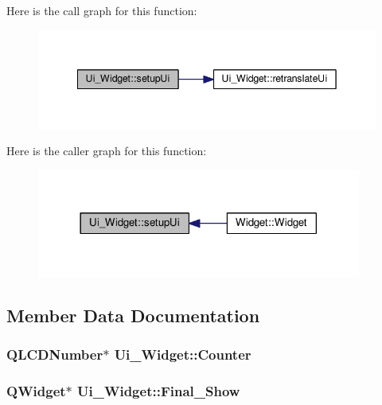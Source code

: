 Here is the call graph for this function\+:
\nopagebreak
\begin{figure}[H]
\begin{center}
\leavevmode
\includegraphics[width=342pt]{classUi__Widget_a9039ed8704971418cbe19ef8c9eea266_cgraph}
\end{center}
\end{figure}




Here is the caller graph for this function\+:
\nopagebreak
\begin{figure}[H]
\begin{center}
\leavevmode
\includegraphics[width=302pt]{classUi__Widget_a9039ed8704971418cbe19ef8c9eea266_icgraph}
\end{center}
\end{figure}




\subsection{Member Data Documentation}
\subsubsection[{\texorpdfstring{Counter}{Counter}}]{\setlength{\rightskip}{0pt plus 5cm}Q\+L\+C\+D\+Number$\ast$ Ui\+\_\+\+Widget\+::\+Counter}\hypertarget{classUi__Widget_a749511d19eed9667d32c6c52edb3f18c}{}\label{classUi__Widget_a749511d19eed9667d32c6c52edb3f18c}
\subsubsection[{\texorpdfstring{Final\+\_\+\+Show}{Final_Show}}]{\setlength{\rightskip}{0pt plus 5cm}Q\+Widget$\ast$ Ui\+\_\+\+Widget\+::\+Final\+\_\+\+Show}\hypertarget{classUi__Widget_a06dc22eac2a37a21aa666a0d1db3009d}{}\label{classUi__Widget_a06dc22eac2a37a21aa666a0d1db3009d}
